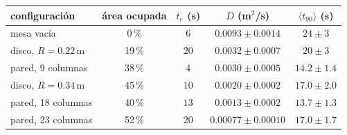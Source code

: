 \begin{tabular}{lcccc}
  \hline
  configuración & área ocupada & $t_e$ (s) & $D$ (m$^{2}$/s) & $\langle t_{90}\rangle$ (s) \\
  \hline
  mesa vacía & 0\,\% & $6$ & $0.0093 \pm 0.0014$ & $24 \pm 3$ \\
  disco, $R = 0.22\,\mathrm{m}$ & 19\,\% & $20$ & $0.0032 \pm 0.0007$ & $20 \pm 3$ \\
  pared, 9 columnas & 38\,\% & $4$ & $0.0030 \pm 0.0005$ & $14.2 \pm 1.4$ \\
  disco, $R = 0.34\,\mathrm{m}$ & 45\,\% & $10$ & $0.0020 \pm 0.0002$ & $17.0 \pm 2.0$ \\
  pared, 18 columnas & 40\,\% & $13$ & $0.0013 \pm 0.0002$ & $13.7 \pm 1.3$ \\
  pared, 23 columnas & 52\,\% & $20$ & $0.00077 \pm 0.00010$ & $17.0 \pm 1.7$ \\
  \hline
\end{tabular}
